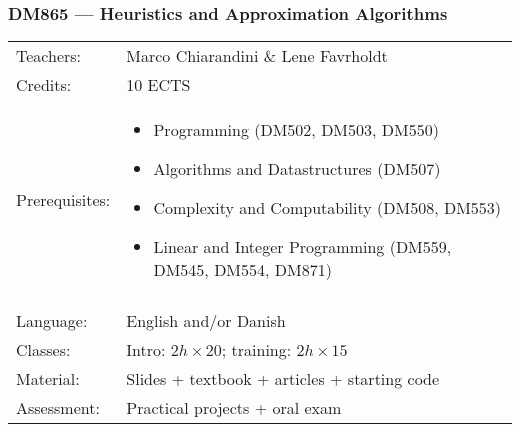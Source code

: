 \documentclass[smaller,aspectratio=169,ignorenonframetext,compress,sans,fleqn,xcolor=dvipsnames,fleqn,table,stillsansserifmath,stillsansseriftext,stillsansserifsmall,stillsansseriflarge]{beamer}
\title{}
\begin{document}

\begin{frame}[label=firstpage]
\frametitle{DM865 --- Heuristics and Approximation Algorithms}

\begin{tabular}{ll}
  {\alert{Teachers:}}
  & Marco Chiarandini \& Lene Favrholdt \\[2mm]

{\alert{Credits:}}
& 10 ECTS\\[-1mm]

\parbox[t]{0pt}{\alert{Prerequisites:}}
& \begin{minipage}[t]{0.72\textwidth}
    \begin{itemize}
    \item[\CheckmarkBold] Programming (DM502, DM503, DM550)
    \item[\CheckmarkBold] Algorithms and Datastructures (DM507)
    \item[\color{gray}\Checkmark] Complexity and Computability (DM508, DM553)
    \item[\color{gray}\Checkmark] Linear and Integer Programming (DM559, DM545, DM554, DM871)
    \end{itemize}
  \end{minipage}\\

&\\[-1mm]

{\alert{Language:}}
& English and/or Danish\\[2mm]

{\alert{Classes:}}
& Intro: $2h\times 20$; training: $2h\times 15$ \\[2mm]

{\alert{Material:}}
& Slides + textbook + articles + starting code\\[2mm]

{\alert{Assessment:}}
& Practical projects + oral exam
\end{tabular}
\end{frame}
\end{document}
